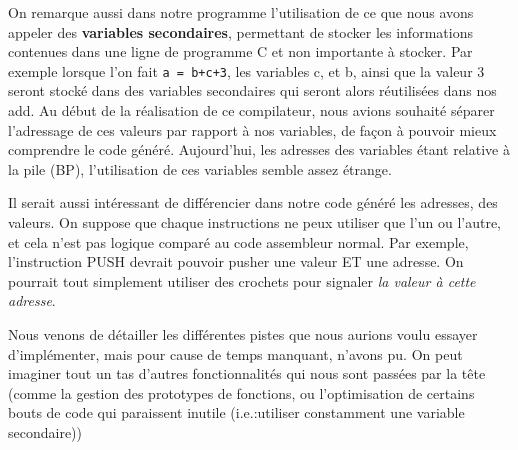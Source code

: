     On remarque aussi dans notre programme l'utilisation de ce que nous avons appeler des \textbf{variables secondaires}, permettant de stocker les informations contenues dans une ligne de programme C et non importante à stocker. Par exemple lorsque l'on fait \texttt{a = b+c+3}, les variables c, et b, ainsi que la valeur 3 seront stocké dans des variables secondaires qui seront alors réutilisées dans nos add. Au début de la réalisation de ce compilateur, nous avions souhaité séparer l'adressage de ces valeurs par rapport à nos variables, de façon à pouvoir mieux comprendre le code généré. Aujourd'hui, les adresses des variables étant relative à la pile (BP), l'utilisation de ces variables semble assez étrange.
    
    Il serait aussi intéressant de différencier dans notre code généré les adresses, des valeurs. On suppose que chaque instructions ne peux utiliser que l'un ou l'autre, et cela n'est pas logique comparé au code assembleur normal. Par exemple, l'instruction PUSH devrait pouvoir pusher une valeur ET une adresse. On pourrait tout simplement utiliser des crochets pour signaler \textit{la valeur à cette adresse}.
    
     Nous venons de détailler les différentes pistes que nous aurions voulu essayer d'implémenter, mais pour cause de temps manquant, n'avons pu. On peut imaginer tout un tas d'autres fonctionnalités qui nous sont passées par la tête (comme la gestion des prototypes de fonctions,  ou l'optimisation de certains bouts de code qui paraissent inutile (i.e.:utiliser constamment une variable secondaire))